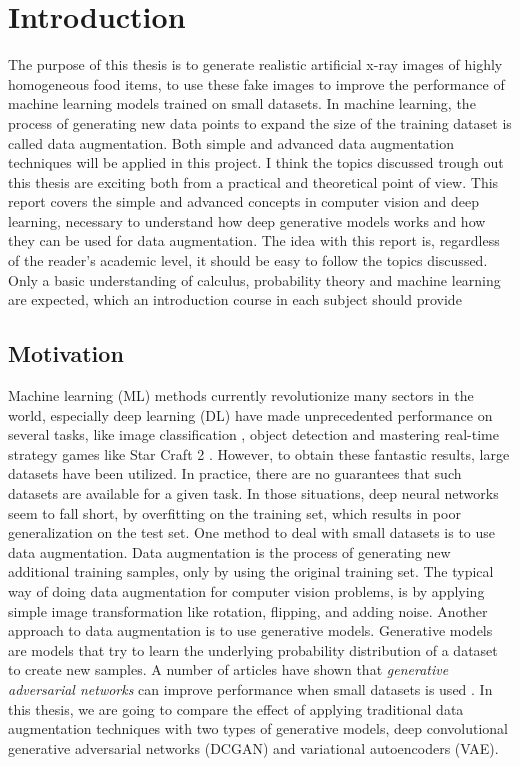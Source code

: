 \documentclass[11pt]{article}
\begin{document}
\section{Introduction}\label{sec:introduction}

The purpose of this thesis is to generate realistic artificial x-ray images of highly homogeneous
food items, to use these fake images to improve the performance
of machine learning models trained on small datasets.  In machine learning, the process
of generating new data points to expand the size of the training dataset is called data
augmentation. Both simple and advanced data augmentation techniques will be applied
in this project. I think the topics discussed trough out this thesis are exciting both from a
practical and theoretical point of view. This report covers the simple and advanced concepts
in computer vision and deep learning, necessary to understand how deep generative models
works and how they can be used for data augmentation.  The idea with this report is, 
regardless of the reader's academic level, it should be easy to follow the topics discussed. Only a basic understanding of calculus, probability theory and machine learning are expected, which an
introduction course in each subject should provide


\subsection{Motivation}

Machine learning (ML) methods currently revolutionize many sectors in the world, especially deep learning (DL) have made unprecedented performance on several tasks, like
image classification \cite{Krizhevsky:2012:ICD:2999134.2999257}, object detection \cite{Ren:2015:FRT:2969239.2969250} and mastering real-time strategy games like Star Craft 2 \cite{alphastarblog}.  However, to obtain these fantastic results, large datasets have been utilized. In
practice, there are no guarantees that such datasets are available for a given task. In those
situations, deep neural networks seem to fall short, by overfitting on the training set, which
results in poor generalization on the test set. 
One method to deal with small datasets is to use data augmentation. Data augmentation is the process of generating new additional training samples, only by using the original training set. The typical way of doing data augmentation for computer vision problems, is by applying simple image transformation like rotation, flipping, and adding noise. Another approach to data augmentation is to use generative models.  Generative models are models that try to learn the underlying probability distribution of a dataset to create new samples.
A number of articles have shown that \textit{generative adversarial networks} can improve performance when small datasets is used \cite{antoniou2018data} \cite{gan_works}. In this thesis, we are going to compare the effect of applying traditional data augmentation techniques with two types of generative models, deep convolutional generative adversarial networks (DCGAN) and variational autoencoders (VAE).
\end{document}
